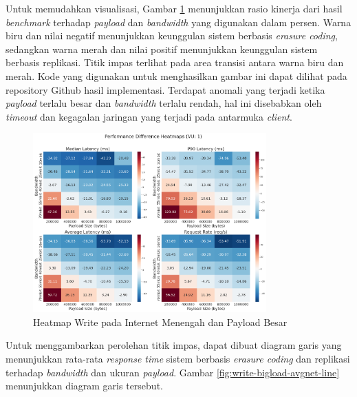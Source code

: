 \begin{enumerate}
	      Untuk memudahkan visualisasi, Gambar \ref{fig:write-bigload-avgnet-heatmap} menunjukkan rasio kinerja dari hasil \textit{benchmark} terhadap \textit{payload} dan \textit{bandwidth} yang digunakan dalam persen. Warna biru dan nilai negatif menunjukkan keunggulan sistem berbasis \textit{erasure coding}, sedangkan warna merah dan nilai positif menunjukkan keunggulan sistem berbasis replikasi. Titik impas terlihat pada area transisi antara warna biru dan merah.  Kode yang digunakan untuk menghasilkan gambar ini dapat dilihat pada repository Github hasil implementasi. Terdapat anomali yang terjadi ketika \textit{payload} terlalu besar dan \textit{bandwidth} terlalu rendah, hal ini disebabkan oleh \textit{timeout} dan kegagalan jaringan yang terjadi pada antarmuka \textit{client}.

	      \begin{figure}[ht]
		      \centering
		      \includegraphics[width=0.8\textwidth]{resources/chapter-4/write_bigload_avgnet_heatmap.png}

		      \caption{Heatmap Write pada Internet Menengah dan Payload Besar}
		      \label{fig:write-bigload-avgnet-heatmap}
	      \end{figure}

	      Untuk menggambarkan perolehan titik impas, dapat dibuat diagram garis yang menunjukkan rata-rata \textit{response time} sistem berbasis \textit{erasure coding} dan replikasi terhadap \textit{bandwidth} dan ukuran \textit{payload}. Gambar \ref{fig:write-bigload-avgnet-line} menunjukkan diagram garis tersebut.


\end{enumerate}
